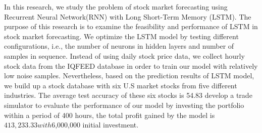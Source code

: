In this research, we study the problem of stock market forecasting using Recurrent
Neural Network(RNN) with Long Short-Term Memory (LSTM). The purpose of this
research is to examine the feasibility and performance of LSTM in stock market
forecasting. We optimize the LSTM model by testing different configurations, i.e., the
number of neurons in hidden layers and number of samples in sequence. Instead of
using daily stock price data, we collect hourly stock data from the IQFEED database in
order to train our model with relatively low noise samples. Nevertheless, based on the
prediction results of LSTM model, we build up a stock database with six U.S market
stocks from five different industries. The average test accuracy of these six stocks is
54.83%
develop a trade simulator to evaluate the performance of our model by investing the
portfolio within a period of 400 hours, the total profit gained by the model is
$413,233.33 with $6,000,000 initial investment.